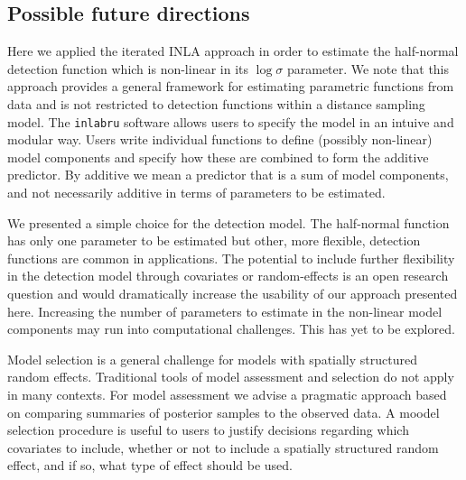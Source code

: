 \documentclass[preprint,12pt]{elsarticle}
\begin{document}
\subsection*{Possible future directions}

Here we applied the iterated INLA approach in order to estimate the half-normal detection function which is non-linear in its $\log \sigma$ parameter.  We note that this approach provides a general framework for estimating parametric functions from data and is not restricted to detection functions within a distance sampling model.  The \texttt{inlabru} software allows users to specify the model in an intuive and modular way.  Users write individual functions to define (possibly non-linear) model components and specify how these are combined to form the additive predictor.  By additive we mean a predictor that is a sum of model components, and not necessarily additive in terms of parameters to be estimated.

We presented a simple choice for the detection model.  The half-normal function has only one parameter to be estimated but other, more flexible, detection functions are common in applications.  The potential to include further flexibility in the detection model through covariates or random-effects is an open research question and would dramatically increase the usability of our approach presented here. Increasing the number of parameters to estimate in the non-linear model components may run into computational challenges.  This has yet to be explored.  

Model selection is a general challenge for models with spatially structured random effects.  Traditional tools of model assessment and selection do not apply in many contexts.  For model assessment we advise a pragmatic approach based on comparing summaries of posterior samples to the observed data. A moodel selection procedure is useful to users to justify decisions regarding which covariates to include, whether or not to include a spatially structured random effect, and if so, what type of effect should be used. 



\end{document}
